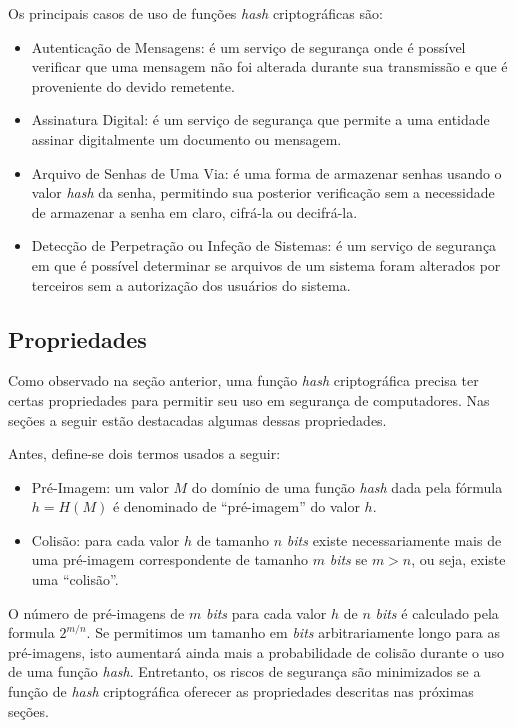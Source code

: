 \documentclass[12pt]{article}
\begin{document}
Os principais casos de uso de funções \textit{hash} criptográficas são:
\begin{itemize}
    \item Autenticação de Mensagens: é um serviço de segurança onde é possível
        verificar que uma mensagem não foi alterada durante sua transmissão e
        que é proveniente do devido remetente.
    \item Assinatura Digital: é um serviço de segurança que permite a uma
        entidade assinar digitalmente um documento ou mensagem.
    \item Arquivo de Senhas de Uma Via: é uma forma de armazenar senhas usando
        o valor \textit{hash} da senha, permitindo sua posterior verificação
        sem a necessidade de armazenar a senha em claro, cifrá-la ou
        decifrá-la.
    \item Detecção de Perpetração ou Infeção de Sistemas: é um serviço de
        segurança em que é possível determinar se arquivos de um sistema foram
        alterados por terceiros sem a autorização dos usuários do sistema.
\end{itemize}

\subsection{Propriedades}

Como observado na seção anterior, uma função \textit{hash} criptográfica
precisa ter certas propriedades para permitir seu uso em segurança de
computadores. Nas seções a seguir estão destacadas algumas dessas propriedades.

Antes, define-se dois termos usados a seguir:
\begin{itemize}
    \item Pré-Imagem: um valor $M$ do domínio de uma função \textit{hash} dada
        pela fórmula $h = H(M)$ é denominado de “pré-imagem” do valor $h$.
    \item Colisão: para cada valor $h$ de tamanho $n$ \textit{bits} existe
        necessariamente mais de uma pré-imagem correspondente de tamanho $m$
        \textit{bits} se $m > n$, ou seja, existe uma ``colisão''.
\end{itemize}

O número de pré-imagens de $m$ \textit{bits} para cada valor $h$ de $n$
\textit{bits} é calculado pela formula $2^{m/n}$. Se permitimos um tamanho em
\textit{bits} arbitrariamente longo para as pré-imagens, isto aumentará ainda
mais a probabilidade de colisão durante o uso de uma função \textit{hash}.
Entretanto, os riscos de segurança são minimizados se a função de \textit{hash}
criptográfica oferecer as propriedades descritas nas próximas seções.
\end{document}
